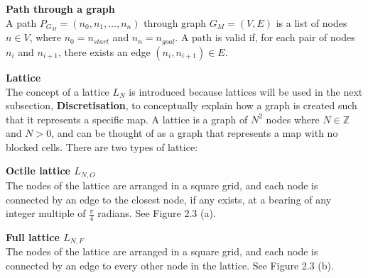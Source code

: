 \documentclass[12pt,notitlepage]{report}
\begin{document}
\begin{description}
\item{\bfseries Path through a graph}\\
A path $P_{G_{M}} = (n_{0}, n_{1}, \ldots, n_{n})$ through graph $G_{M}=(V,E)$ is a list of nodes $n \in V$, where $n_{0}=n_{start}$ and $n_{n}=n_{goal}$. A path is valid if, for each pair of nodes $n_{i}$ and $n_{i+1}$, there exists an edge $(n_{i},n_{i+1}) \in E$.
\end{description}

\noindent
{\bfseries Lattice}\\
\noindent
The concept of a lattice $L_{N}$ is introduced because lattices will be used in the next subsection, {\bfseries Discretisation}, to conceptually explain how a graph is created such that it represents a specific map. A lattice is a graph of $N^{2}$ nodes where $N \in\mathbb{Z}$ and $N > 0$, and can be thought of as a graph that represents a map with no blocked cells. There are two types of lattice:\\

\begin{description}
\item{\bfseries Octile lattice $L_{N,O}$}\\The nodes of the lattice are arranged in a square grid, and each node is connected by an edge to the closest node, if any exists, at a bearing of any integer multiple of $\frac{\pi}{4}$ radians. See Figure 2.3 (a).

\item{\bfseries Full lattice $L_{N,F}$}\\The nodes of the lattice are arranged in a square grid, and each node is connected by an edge to every other node in the lattice. See Figure 2.3 (b).
\end{description}
\end{document}
